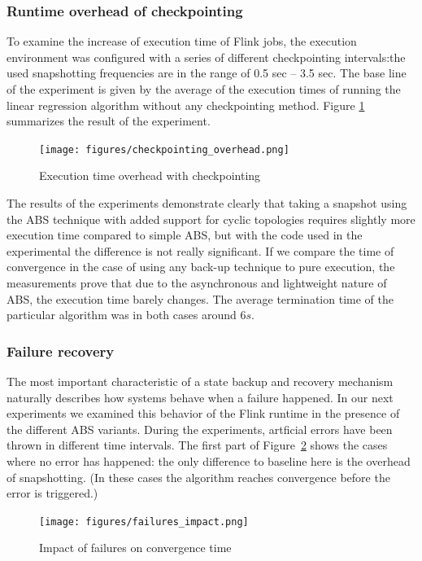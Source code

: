 \subsubsection{Runtime overhead of checkpointing}
To examine the increase of execution time of Flink jobs, the execution environment was configured with a series of different checkpointing intervals:the used snapshotting frequencies are in the range of 0.5 sec -- 3.5 sec. The base line of the experiment is given by the average of the execution times of running the linear regression algorithm without any checkpointing method. Figure \ref{fig:checkpoint} summarizes the result of the experiment.

\begin{figure}[!ht]
  \centering    
      \texttt{[image: figures/checkpointing\_overhead.png]}
  \caption{Execution time overhead with checkpointing}
  \label{fig:checkpoint}
\end{figure}     

The results of the experiments demonstrate clearly that taking a snapshot using  the ABS technique with added support for cyclic topologies requires slightly more execution time compared to simple ABS, but with the code used in the experimental the difference is not really significant. If we compare the time of convergence in the case of using any back-up technique to pure execution, the measurements prove that due to the asynchronous and lightweight nature of ABS, the execution time barely changes. The average termination time of the particular algorithm was in both cases around $6s$.
 
\subsubsection{Failure recovery}

The most important characteristic of a state backup and recovery mechanism naturally describes how systems behave when a failure happened. In our next experiments we examined this behavior of the Flink runtime in the presence of the different ABS variants. During the experiments, artficial errors have been thrown in different time intervals. The first part of Figure~\ref{fig:failures} shows the cases where no error has happened: the only difference to baseline here is the overhead of snapshotting. (In these cases the algorithm reaches convergence before the error is triggered.) 

\begin{figure}[!ht]
  \centering    
      \texttt{[image: figures/failures\_impact.png]}
  \caption{Impact of failures on convergence time}
  \label{fig:failures}
\end{figure}     

